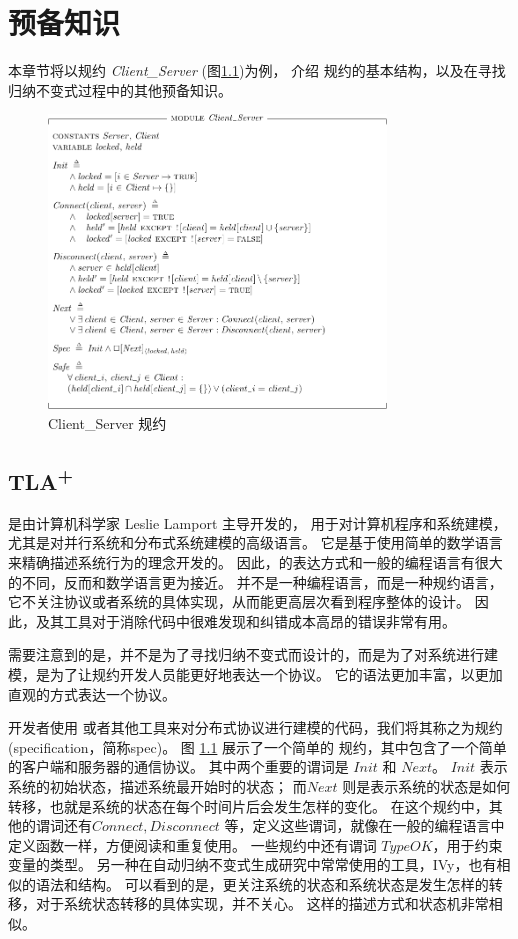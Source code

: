 \chapter{预备知识}\label{chap:pre-knowleage}

本章节将以规约 \textit{Client\_Server} (图\ref{fig:client_server})为例，
介绍 \TLA 规约的基本结构，以及在寻找归纳不变式过程中的其他预备知识。
\begin{figure}
    \centering
    \includegraphics[width=0.8\textwidth]{figures/Client_Server.pdf}
    \caption{Client\_Server 规约}
    \label{fig:client_server}
\end{figure}

\section{\texorpdfstring{TLA\textsuperscript{+}}{TLA+}}
\href{https://lamport.azurewebsites.net/tla/tla.html}{\TLA} \cite{TLA}是由计算机科学家 Leslie Lamport 主导开发的，
用于对计算机程序和系统建模，尤其是对并行系统和分布式系统建模的高级语言。
它是基于使用简单的数学语言来精确描述系统行为的理念开发的。
因此，\TLA 的表达方式和一般的编程语言有很大的不同，反而和数学语言更为接近。
\TLA 并不是一种编程语言，而是一种规约语言，它不关注协议或者系统的具体实现，从而能更高层次看到程序整体的设计。
因此，\TLA 及其工具对于消除代码中很难发现和纠错成本高昂的错误非常有用。

需要注意到的是，\TLA 并不是为了寻找归纳不变式而设计的，而是为了对系统进行建模，是为了让规约开发人员能更好地表达一个协议。
它的语法更加丰富，以更加直观的方式表达一个协议。

开发者使用 \TLA 或者其他工具来对分布式协议进行建模的代码，我们将其称之为规约(specification，简称spec)。
图 \ref{fig:client_server} 展示了一个简单的 \TLA 规约，其中包含了一个简单的客户端和服务器的通信协议。
其中两个重要的谓词是 $Init$ 和 $Next$。
$Init$ 表示系统的初始状态，描述系统最开始时的状态；
而$Next$ 则是表示系统的状态是如何转移，也就是系统的状态在每个时间片后会发生怎样的变化。
在这个规约中，其他的谓词还有$Connect, Disconnect$ 等，定义这些谓词，就像在一般的编程语言中定义函数一样，方便阅读和重复使用。
一些规约中还有谓词 $TypeOK$，用于约束变量的类型。
另一种在自动归纳不变式生成研究中常常使用的工具，IVy，也有相似的语法和结构。
可以看到的是，\TLA 更关注系统的状态和系统状态是发生怎样的转移，对于系统状态转移的具体实现，\TLA 并不关心。
这样的描述方式和状态机非常相似。

